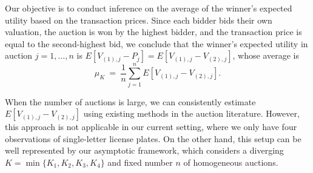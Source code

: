 Our objective is to conduct inference on the average of the winner's expected utility based on the transaction prices. Since each bidder bids their own valuation, the auction is won by the highest bidder, and the transaction price is equal to the second-highest bid, we conclude that the winner's expected utility in auction $j=1,\dots,n$ is $E[V_{(1),j}-P_{j}]=E[V_{(1),j}-V_{(2),j}] $, whose average is
\begin{equation}
\mu _{K}~=~ \frac{1}{n}\sum_{j=1}^{n}E[V_{(1),j}-V_{(2),j}].
\label{eq:winner1}
\end{equation}

\begin{runningexamplecont}
When the number of auctions is large, we can consistently estimate $E[V_{(1),j}-V_{(2),j}]$ using existing methods in the auction literature. However, this approach is not applicable in our current setting, where we only have four observations of single-letter license plates. On the other hand, this setup can be well represented by our asymptotic framework, which considers a diverging $K = \min\{K_1,K_2,K_3,K_4\}$ and fixed number $n$ of homogeneous auctions.
\end{runningexamplecont}


